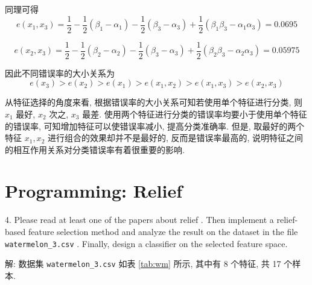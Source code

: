 \documentclass{article}
\begin{document}
同理可得
\begin{equation}
  e(x_1,x_3)
  =\frac{1}{2}-\frac{1}{2}(\beta_1-\alpha_1)-\frac{1}{2}(\beta_3-\alpha_3)+\frac{1}{2}(\beta_1\beta_3-\alpha_1\alpha_3)
  =0.0695
\end{equation}

\begin{equation}
  e(x_2,x_3)
  =\frac{1}{2}-\frac{1}{2}(\beta_2-\alpha_2)-\frac{1}{2}(\beta_3-\alpha_3)+\frac{1}{2}(\beta_2\beta_3-\alpha_2\alpha_3)
  =0.05975
\end{equation}

因此不同错误率的大小关系为
\begin{equation}
  e(x_3)>e(x_2)>e(x_1)>e(x_1,x_2)>e(x_1,x_3)>e(x_2,x_3)
\end{equation}

从特征选择的角度来看, 根据错误率的大小关系可知若使用单个特征进行分类, 则 $x_1$ 最好, $x_2$ 次之, $x_3$ 最差. 使用两个特征进行分类的错误率均要小于使用单个特征的错误率, 可知增加特征可以使错误率减小, 提高分类准确率. 但是, 取最好的两个特征 $x_1,x_2$ 进行组合的效果却并不是最好的, 反而是错误率最高的, 说明特征之间的相互作用关系对分类错误率有着很重要的影响.

\section*{Programming: Relief}

4. Please read at least one of the papers about relief \cite{ReliefF,Relief-based}. Then implement a relief-based feature selection method and analyze the result on the dataset in the file \verb|watermelon_3.csv| \cite{MLbook}. Finally, design a classifier on the selected feature space.

解: 数据集 \verb|watermelon_3.csv| 如表 \ref{tab:wm} 所示, 其中有 8 个特征, 共 17 个样本.
\end{document}
